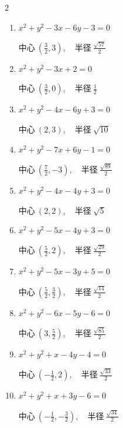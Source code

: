 \begin{multicols}{2}
\begin{enumerate}
        $\displaystyle 中心\: \left(3,\frac{1}{2}\right), \quad 半径 \ \frac{\sqrt{29}}{2}$

  \item $x^{2}+y^{2}-3x-6y-3=0$

        $\displaystyle 中心\: \left(\frac{3}{2},3\right), \quad 半径 \ \frac{\sqrt{57}}{2}$

  \item $x^{2}+y^{2}-3x+2=0$

        $\displaystyle 中心\: \left(\frac{3}{2},0\right), \quad 半径 \ \frac{1}{2}$

  \item $x^{2}+y^{2}-4x-6y+3=0$

        $\displaystyle 中心\: \left(2,3\right), \quad 半径 \ \sqrt{10}$

  \item $x^{2}+y^{2}-7x+6y-1=0$

        $\displaystyle 中心\: \left(\frac{7}{2},-3\right), \quad 半径 \ \frac{\sqrt{89}}{2}$

  \item $x^{2}+y^{2}-4x-4y+3=0$

        $\displaystyle 中心\: \left(2,2\right), \quad 半径 \ \sqrt{5}$

  \item $x^{2}+y^{2}-5x-4y+3=0$

        $\displaystyle 中心\: \left(\frac{5}{2},2\right), \quad 半径 \ \frac{\sqrt{29}}{2}$

  \item $x^{2}+y^{2}-5x-3y+5=0$

        $\displaystyle 中心\: \left(\frac{5}{2},\frac{3}{2}\right), \quad 半径 \ \frac{\sqrt{14}}{2}$

  \item $x^{2}+y^{2}-6x-5y-6=0$

        $\displaystyle 中心\: \left(3,\frac{5}{2}\right), \quad 半径 \ \frac{\sqrt{85}}{2}$

  \item $x^{2}+y^{2}+x-4y-4=0$

        $\displaystyle 中心\: \left(-\frac{1}{2},2\right), \quad 半径 \ \frac{\sqrt{33}}{2}$

  \item $x^{2}+y^{2}+x+3y-6=0$

        $\displaystyle 中心\: \left(-\frac{1}{2},-\frac{3}{2}\right), \quad 半径 \ \frac{\sqrt{34}}{2}$

\columnbreak %


\end{enumerate}
\end{multicols}

